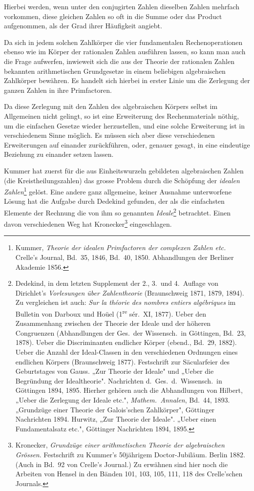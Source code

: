 \documentclass[12pt,a4paper]{article}
\theoremstyle{definition}
\begin{document}
Hierbei werden, wenn unter den conjugirten Zahlen dieselben Zahlen mehrfach vorkommen, diese gleichen Zahlen so oft in die Summe oder das Product aufgenommen, als der Grad ihrer Häufigkeit angiebt.

Da sich in jedem solchen Zahlkörper die vier fundamentalen Rechenoperationen ebenso wie im Körper der rationalen Zahlen ausführen lassen, so kann man auch die Frage aufwerfen, inwieweit sich die aus der Theorie der rationalen Zahlen bekannten arithmetischen Grundgesetze in einem beliebigen algebraischen Zahlkörper bewähren. Es handelt sich hierbei in erster Linie um die Zerlegung der ganzen Zahlen in ihre Primfactoren.

Da diese Zerlegung mit den Zahlen des algebraischen Körpers selbst im Allgemeinen nicht gelingt, so ist eine Erweiterung des Rechenmaterials nöthig, um die einfachen Gesetze wieder herzustellen, und eine solche Erweiterung ist in verschiedenem Sinne möglich. Es müssen sich aber diese verschiedenen Erweiterungen auf einander zurückführen, oder, genauer gesagt, in eine eindeutige Beziehung zu einander setzen lassen.

Kummer hat zuerst für die aus Einheitswurzeln gebildeten algebraischen Zahlen (die Kreistheilungszahlen) das grosse Problem durch die Schöpfung der \emph{idealen Zahlen}\footnote{Kummer, \textit{Theorie der idealen Primfactoren der complexen Zahlen etc.} Crelle's Journal, Bd.~35, 1846, Bd.~40, 1850. Abhandlungen der Berliner Akademie 1856.} gelöst. Eine andere ganz allgemeine, keiner Ausnahme unterworfene Lösung hat die Aufgabe durch Dedekind gefunden, der als die einfachsten Elemente der Rechnung die von ihm so genannten \emph{Ideale}\footnote{Dedekind, in dem letzten Supplement der 2., 3.\ und 4.\ Auflage von Dirichlet's \textit{Vorlesungen über Zahlentheorie} (Braunschweig 1871, 1879, 1894). Zu vergleichen ist auch: \textit{Sur la théorie des nombres entiers algébriques} im Bulletin von Darboux und Hoüel (1\textsuperscript{re} sér.\ XI, 1877). Ueber den Zusammenhang zwischen der Theorie der Ideale und der höheren Congruenzen (Abhandlungen der Ges.\ der Wissensch.\ in Göttingen, Bd.~23, 1878). Ueber die Discriminanten endlicher Körper (ebend., Bd.~29, 1882). Ueber die Anzahl der Ideal-Classen in den verschiedenen Ordnungen eines endlichen Körpers (Braunschweig 1877). Festschrift zur Säcularfeier des Geburtstages von Gauss. „Zur Theorie der Ideale" und „Ueber die Begründung der Idealtheorie". Nachrichten d.\ Ges.\ d.\ Wissensch.\ in Göttingen 1894, 1895. Hierher gehören auch die Abhandlungen von Hilbert, „Ueber die Zerlegung der Ideale etc.", \textit{Mathem.\ Annalen}, Bd.~44, 1893. „Grundzüge einer Theorie der Galois'schen Zahlkörper", Göttinger Nachrichten 1894. Hurwitz, „Zur Theorie der Ideale". „Ueber einen Fundamentalsatz etc.", Göttinger Nachrichten 1894, 1895.} betrachtet. Einen davon verschiedenen Weg hat Kronecker\footnote{Kronecker, \textit{Grundzüge einer arithmetischen Theorie der algebraischen Grössen}. Festschrift zu Kummer's 50jährigem Doctor-Jubiläum. Berlin 1882. (Auch in Bd.~92 von Crelle's Journal.) Zu erwähnen sind hier noch die Arbeiten von Hensel in den Bänden 101, 103, 105, 111, 118 des Crelle'schen Journals.} eingeschlagen.
\end{document}
